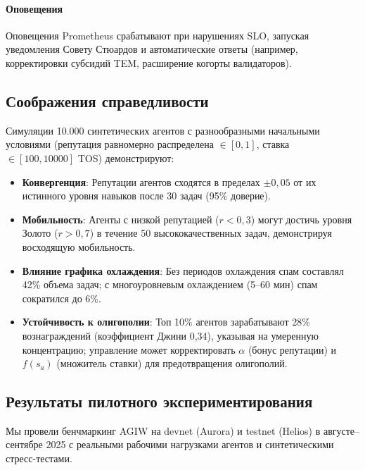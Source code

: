 \documentclass[11pt]{article}
\begin{document}
\paragraph{Оповещения} Оповещения Prometheus срабатывают при нарушениях SLO, запуская уведомления Совету Стюардов и автоматические ответы (например, корректировки субсидий TEM, расширение когорты валидаторов).

\subsection{Соображения справедливости}
Симуляции 10.000 синтетических агентов с разнообразными начальными условиями (репутация равномерно распределена $\in [0,1]$, ставка $\in [100, 10000]$ TOS) демонстрируют:
\begin{itemize}[noitemsep]
  \item \textbf{Конвергенция}: Репутации агентов сходятся в пределах $\pm0,05$ от их истинного уровня навыков после 30 задач (95\% доверие).
  \item \textbf{Мобильность}: Агенты с низкой репутацией ($r<0,3$) могут достичь уровня Золото ($r>0,7$) в течение 50 высококачественных задач, демонстрируя восходящую мобильность.
  \item \textbf{Влияние графика охлаждения}: Без периодов охлаждения спам составлял 42\% объема задач; с многоуровневым охлаждением (5--60 мин) спам сократился до 6\%.
  \item \textbf{Устойчивость к олигополии}: Топ 10\% агентов зарабатывают 28\% вознаграждений (коэффициент Джини 0,34), указывая на умеренную концентрацию; управление может корректировать $\alpha$ (бонус репутации) и $f(s_a)$ (множитель ставки) для предотвращения олигополий.
\end{itemize}

\subsection{Результаты пилотного экспериментирования}
\label{sec:pilot-results}
Мы провели бенчмаркинг AGIW на devnet (Aurora) и testnet (Helios) в августе--сентябре 2025 с реальными рабочими нагрузками агентов и синтетическими стресс-тестами.
\end{document}
